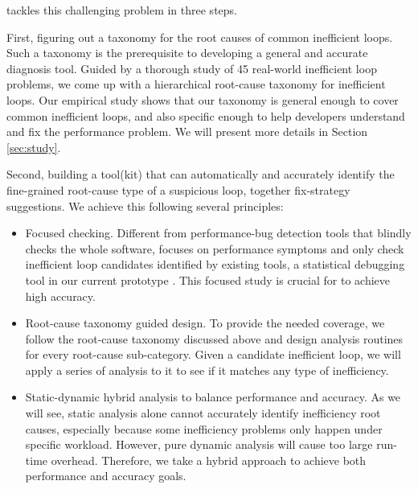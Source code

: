 \Tool tackles this challenging problem in three steps.

First, figuring out a taxonomy for the root causes of common inefficient loops.
Such a taxonomy is the prerequisite to developing a general and accurate
diagnosis tool. Guided by a thorough study of 45 real-world inefficient
loop problems, we come up with a hierarchical root-cause taxonomy for
inefficient loops. 
Our empirical study shows that our taxonomy is general enough to cover
common inefficient loops, and also specific enough to help developers understand
and fix the performance problem. We will present more details 
in Section \ref{sec:study}.
 
Second, building a tool(kit) \Tool that can automatically and accurately
identify the fine-grained root-cause type of a suspicious loop, 
together fix-strategy suggestions. 
We achieve this following several principles:

\begin{itemize}
\item Focused checking. 
Different from performance-bug detection tools that blindly checks the whole
software, \Tool focuses on performance symptoms and only check inefficient
loop candidates identified by existing tools, a statistical debugging
tool in our current prototype \cite{SongOOPSLA2014}. 
This focused study is crucial for \Tool to achieve high
accuracy.

\item Root-cause taxonomy guided design. To provide the needed coverage, we follow
the root-cause taxonomy discussed above and design analysis routines for 
every root-cause sub-category. Given a candidate inefficient loop, we will 
apply a series of analysis to it to see if it matches any type of inefficiency.

\item Static-dynamic hybrid analysis to balance performance and accuracy.
As we will see, static analysis alone cannot accurately identify 
inefficiency root causes, especially because some inefficiency problems only
happen under specific workload. However, pure dynamic analysis will 
cause too large 
run-time overhead. Therefore, we take a hybrid approach to achieve both
performance and accuracy goals.
\end{itemize}

